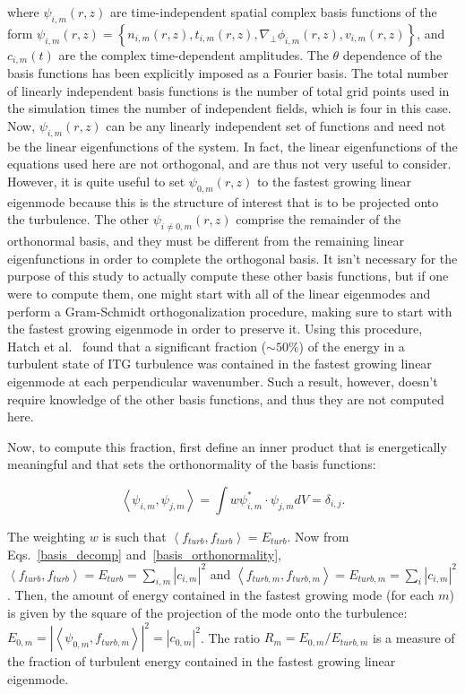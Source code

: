 \documentclass[showpacs,preprintnumbers,amsmath,amssymb,superscriptaddress,aip]{revtex4-1}
\def\beq{\begin{equation}}
\def\eeq{\end{equation}}
\def\grad{\nabla}
\newcommand{\gradperp}{\grad_\perp}
\begin{document}
where $\psi_{i,m}(r,z)$ are time-independent spatial complex basis functions of the form $\psi_{i,m}(r,z) = \left\{ n_{i,m}(r,z),t_{i,m}(r,z),\gradperp \phi_{i,m}(r,z), v_{i,m}(r,z) \right\}$,
and $c_{i,m}(t)$ are the complex time-dependent amplitudes. The $\theta$ dependence of the basis functions has been explicitly imposed as a Fourier basis. The total number of
linearly independent basis functions is the number of total grid points used in the simulation times the number of independent fields, which is four in this case.
Now, $\psi_{i,m}(r,z)$ can be any linearly independent set of functions and need not be the linear eigenfunctions
of the system. In fact, the linear eigenfunctions of the equations used here are not orthogonal, and are thus not very useful to consider. 
However, it is quite useful to set $\psi_{0,m}(r,z)$ to the fastest
growing linear eigenmode because this is the structure of interest that is to be projected onto the turbulence. 
The other $\psi_{i \ne 0,m}(r,z)$ comprise the remainder of the orthonormal basis, and they must be different from
the remaining linear eigenfunctions in order to complete the orthogonal basis. It isn't necessary for the purpose of this study to actually compute these other basis functions, but if one were to compute
them, one might start with all of the linear eigenmodes
and perform a Gram-Schmidt orthogonalization procedure, making sure to start with the fastest growing eigenmode in order to preserve it. Using this procedure, Hatch et al.~\cite{hatch2011}
found that a significant fraction ($\sim 50\%$) of the energy in a turbulent state of ITG turbulence was contained in the fastest growing linear eigenmode at each perpendicular wavenumber.
Such a result, however, doesn't require knowledge of the other basis functions, and thus they are not computed here.

Now, to compute this fraction, first define an inner product that is energetically meaningful and that sets the orthonormality of the basis functions:

\beq
\label{basis_orthonormality}
\left< \psi_{i,m},\psi_{j,m} \right> = \int w \psi_{i,m}^* \cdot \psi_{j,m} dV = \delta_{i,j}.
\eeq

The weighting $w$ is such that $\left< f_{turb}, f_{turb} \right> = E_{turb}$.
Now from Eqs.~\ref{basis_decomp} and~\ref{basis_orthonormality}, $\left< f_{turb}, f_{turb} \right> = E_{turb} = \sum_{i,m} |c_{i,m}|^2$ and 
$\left< f_{turb,m}, f_{turb,m} \right> = E_{turb,m} = \sum_i |c_{i,m}|^2$.
Then, the amount of energy contained in the fastest growing mode (for each $m$) is given by the square of the projection
of the mode onto the turbulence: $E_{0,m} = \left| \left< \psi_{0,m}, f_{turb,m} \right> \right|^2 = |c_{0,m}|^2$. The ratio 
$R_m = E_{0,m}/E_{turb,m}$ is a measure of the fraction of turbulent energy contained in the fastest growing linear eigenmode. 
\end{document}
